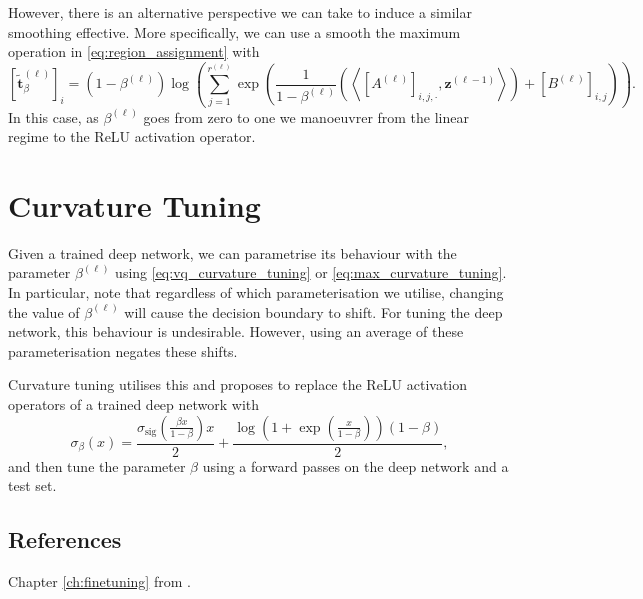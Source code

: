 However, there is an alternative perspective we can take to induce a similar smoothing effective. More specifically, we can use a smooth the maximum operation in \eqref{eq:region_assignment} with
\begin{equation}\label{eq:max_curvature_tuning}
    \left[\tilde{\mathbf{t}}_{\beta}^{(\ell)}\right]_i=\left(1-\beta^{(\ell)}\right)\log\left(\sum_{j=1}^{r^{(\ell)}}\exp\left(\frac{1}{1-\beta^{(\ell)}}\left(\left\langle\left[A^{(\ell)}\right]_{i,j,\cdot},\mathbf{z}^{(\ell-1)}\right\rangle\right)+\left[B^{(\ell)}\right]_{i,j}\right)\right).
\end{equation}
In this case, as $\beta^{(\ell)}$ goes from zero to one we manoeuvrer from the linear regime to the ReLU activation operator.

\section{Curvature Tuning}

Given a trained deep network, we can parametrise its behaviour with the parameter $\beta^{(\ell)}$ using \eqref{eq:vq_curvature_tuning} or \eqref{eq:max_curvature_tuning}. In particular, note that regardless of which parameterisation we utilise, changing the value of $\beta^{(\ell)}$ will cause the decision boundary to shift. For tuning the deep network, this behaviour is undesirable. However, using an average of these parameterisation negates these shifts.

Curvature tuning utilises this and proposes to replace the ReLU activation operators of a trained deep network with $$\sigma_{\beta}(x)=\frac{\sigma_{\text{sig}}\left(\frac{\beta x}{1-\beta}\right)x}{2}+\frac{\log\left(1+\exp\left(\frac{x}{1-\beta}\right)\right)(1-\beta)}{2},$$and then tune the parameter $\beta$ using a forward passes on the deep network and a test set.

\subsection{References}

Chapter \ref{ch:finetuning} from \citet{huCurvatureTuningProvable2025}.